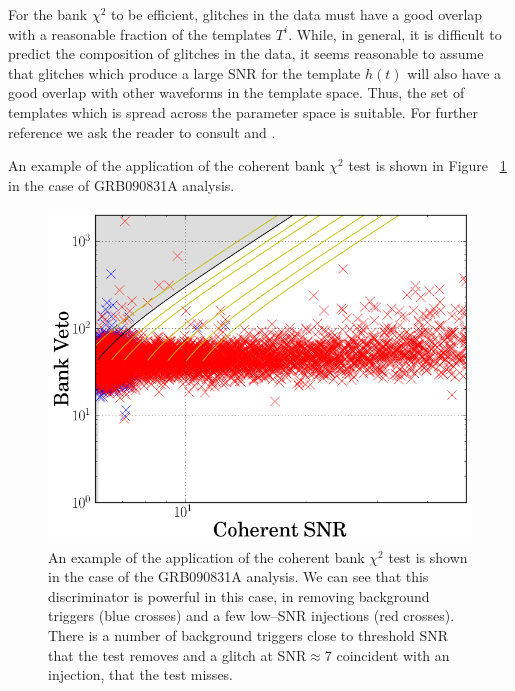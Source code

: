 For the bank $\chi^{2}$ to be efficient, glitches in the data must have a good overlap with a reasonable fraction of the templates $T^{i}$. While, in general, it is difficult to predict the composition of glitches in the data, it seems reasonable to assume that glitches which produce a large \ac{SNR} for the template $h(t)$ will also have a good overlap with other waveforms in the template space.  Thus, the set of templates which is spread across the parameter space is suitable. For further reference we ask the reader to consult \cite{Hanna:2008} and \cite{Harry:2011qh}.

An example of the application of the coherent bank $\chi^2$ test is shown in Figure ~\ref{cohbank} in the case of GRB090831A analysis.
%
\begin{figure}[ht]
\centering
\includegraphics[scale=0.45]{Images/cohBank.png}
\caption{An example of the application of the coherent bank $\chi^2$ test is shown in the case of the GRB090831A analysis. We can see that this discriminator is powerful in this case, in removing background triggers (blue crosses) and a few low--SNR injections (red crosses). There is a number of background triggers close to threshold SNR that the test removes and a glitch at SNR$\approx$7 coincident with an injection, that the test misses.}
\label{cohbank}
\end{figure}
%

